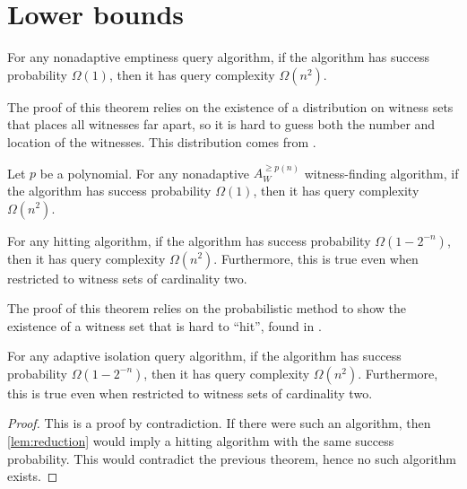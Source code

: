 \documentclass{article}
\begin{document}
\section{Lower bounds}

\begin{theorem}\label{thm:nonadaptiveemptiness}
  For any nonadaptive emptiness query algorithm, if the algorithm has success probability $\Omega(1)$, then it has query complexity $\Omega(n^2)$.
\end{theorem}

The proof of this theorem relies on the existence of a distribution on witness sets that places all witnesses far apart, so it is hard to guess both the number and location of the witnesses.
This distribution comes from \autocite[Theorem~4.2]{dkvmw13}.

\begin{corollary}
  Let $p$ be a polynomial.
  For any nonadaptive $A^{\geq p(n)}_W$ witness-finding algorithm, if the algorithm has success probability $\Omega(1)$, then it has query complexity $\Omega(n^2)$.
\end{corollary}

\begin{theorem}
  For any hitting algorithm, if the algorithm has success probability $\Omega(1 - 2^{-n})$, then it has query complexity $\Omega(n^2)$.
  Furthermore, this is true even when restricted to witness sets of cardinality two.
\end{theorem}

The proof of this theorem relies on the probabilistic method to show the existence of a witness set that is hard to ``hit'', found in \autocite{ablp91}.

\begin{corollary}\label{cor:isolationalg}
  For any adaptive isolation query algorithm, if the algorithm has success probability $\Omega(1 - 2^{-n})$, then it has query complexity $\Omega(n^2)$.
  Furthermore, this is true even when restricted to witness sets of cardinality two.
\end{corollary}
\begin{proof}
  This is a proof by contradiction.
  If there were such an algorithm, then \autoref{lem:reduction} would imply a hitting algorithm with the same success probability.
  This would contradict the previous theorem, hence no such algorithm exists.
\end{proof}
\end{document}
